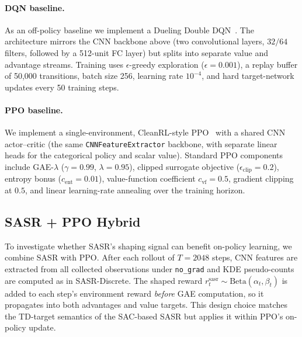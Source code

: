 \documentclass{article}
\begin{document}
\paragraph{DQN baseline.}
As an off-policy baseline we implement a Dueling Double DQN~\citep{mnih2015dqn}. The architecture mirrors the CNN backbone above (two convolutional layers, $32/64$ filters, followed by a 512-unit FC layer) but splits into separate value and advantage streams. Training uses $\epsilon$-greedy exploration ($\epsilon = 0.001$), a replay buffer of 50{,}000 transitions, batch size 256, learning rate $10^{-4}$, and hard target-network updates every 50 training steps.

\paragraph{PPO baseline.}
We implement a single-environment, CleanRL-style PPO~\citep{schulman2017ppo} with a shared CNN actor--critic (the same \texttt{CNNFeatureExtractor} backbone, with separate linear heads for the categorical policy and scalar value). Standard PPO components include GAE-$\lambda$ ($\gamma = 0.99$, $\lambda = 0.95$), clipped surrogate objective ($\epsilon_\text{clip} = 0.2$), entropy bonus ($c_\text{ent} = 0.01$), value-function coefficient $c_\text{vf} = 0.5$, gradient clipping at $0.5$, and linear learning-rate annealing over the training horizon.

\subsection{SASR + PPO Hybrid}

To investigate whether SASR's shaping signal can benefit on-policy learning, we combine SASR with PPO. After each rollout of $T = 2048$ steps, CNN features are extracted from all collected observations under \texttt{no\_grad} and KDE pseudo-counts are computed as in SASR-Discrete. The shaped reward $r_t^\text{sasr} \sim \mathrm{Beta}(\alpha_t, \beta_t)$ is added to each step's environment reward \emph{before} GAE computation, so it propagates into both advantages and value targets. This design choice matches the TD-target semantics of the SAC-based SASR but applies it within PPO's on-policy update.
\end{document}
